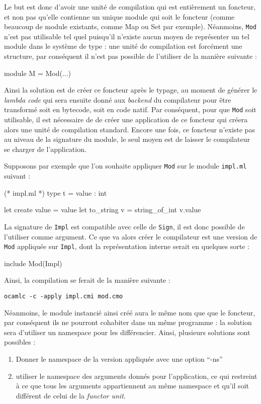 \documentclass[11pt,a4paper]{report}
\begin{document}
Le but est donc d'avoir une unité de compilation qui est entièrement un
foncteur, et non pas qu'elle contienne un unique module qui soit le foncteur
(comme beaucoup de module existants, comme Map ou Set par exemple). Néanmoins,
\texttt{Mod} n'est pas utilisable tel quel puisqu'il n'existe aucun moyen de
représenter un tel module dans le système de type : une unité de compilation est
forcément une structure, par conséquent il n'est pas possible de l'utiliser de
la manière suivante :
\begin{OCaml}
module M = Mod(...)
\end{OCaml}
Ainsi la solution est de créer ce foncteur après le typage, au moment de générer
le \emph{lambda code} qui sera ensuite donné aux \emph{backend} du compilateur
pour être transformé soit en bytecode, soit en code natif. Par conséquent, pour
que \texttt{Mod} soit utilisable, il est nécessaire de de créer une application
de ce foncteur qui créera alors une unité de compilation standard.  Encore une
fois, ce foncteur n'existe pas au niveau de la signature du module, le seul
moyen est de laisser le compilateur se charger de l'application.

Supposons par exemple que l'on souhaite appliquer \texttt{Mod} sur le module
\texttt{impl.ml} suivant :
\begin{OCaml}
(* impl.ml *)
type t = { value : int }

let create value = { value }
let to_string v = string_of_int v.value
\end{OCaml}

La signature de \texttt{Impl} est compatible avec celle de \texttt{Sign}, il est
donc possible de l'utiliser comme argument. Ce que va alors créer le compilateur
est une version de \texttt{Mod} appliquée sur \texttt{Impl}, dont la
représentation interne serait en quelques sorte :
\begin{OCaml}
include Mod(Impl)
\end{OCaml}

Ainsi, la compilation se ferait de la manière suivante :
\begin{verbatim}
ocamlc -c -apply impl.cmi mod.cmo
\end{verbatim}
Néanmoins, le module instancié ainsi créé aura le même nom que que le foncteur,
par conséquent ils ne pourront cohabiter dans un même programme : la solution
sera d'utiliser un namespace pour les différencier. Ainsi, plusieurs solutions
sont possibles :
\begin{enumerate}
\item Donner le namespace de la version appliquée avec une option ``-ns''
\item utiliser le namespace des arguments donnés pour l'application, ce
  qui restreint à ce que tous les arguments appartiennent au même namespace et
  qu'il soit différent de celui de la \emph{functor unit}.  
\end{enumerate}
\end{document}
